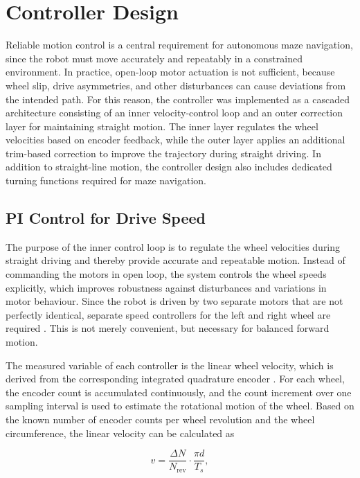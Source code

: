 \section{Controller Design}

Reliable motion control is a central requirement for autonomous maze navigation, since the robot must move accurately and repeatably in a constrained environment. In practice, open-loop motor actuation is not sufficient, because wheel slip, drive asymmetries, and other disturbances can cause deviations from the intended path. For this reason, the controller was implemented as a cascaded architecture consisting of an inner velocity-control loop and an outer correction layer for maintaining straight motion. The inner layer regulates the wheel velocities based on encoder feedback, while the outer layer applies an additional trim-based correction to improve the trajectory during straight driving. In addition to straight-line motion, the controller design also includes dedicated turning functions required for maze navigation.

\subsection{PI Control for Drive Speed}

The purpose of the inner control loop is to regulate the wheel velocities during straight driving and thereby provide accurate and repeatable motion. Instead of commanding the motors in open loop, the system controls the wheel speeds explicitly, which improves robustness against disturbances and variations in motor behaviour. Since the robot is driven by two separate motors that are not perfectly identical, separate speed controllers for the left and right wheel are required \cite{mueller2014maschinen}. This is not merely convenient, but necessary for balanced forward motion.

The measured variable of each controller is the linear wheel velocity, which is derived from the corresponding integrated quadrature encoder \cite{datasheet_motor}. For each wheel, the encoder count is accumulated continuously, and the count increment over one sampling interval is used to estimate the rotational motion of the wheel. Based on the known number of encoder counts per wheel revolution and the wheel circumference, the linear velocity can be calculated as

\begin{equation}
v = \frac{\Delta N}{N_{\mathrm{rev}}} \cdot \frac{\pi d}{T_s},
\end{equation}


